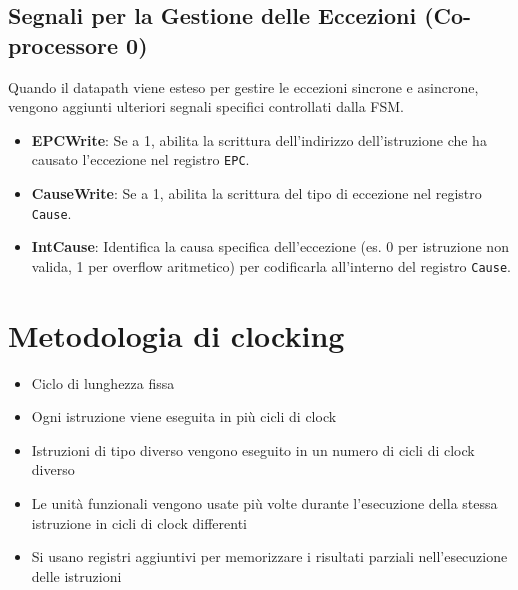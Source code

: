 \subsection{Segnali per la Gestione delle Eccezioni (Co-processore 0)}
Quando il datapath viene esteso per gestire le eccezioni sincrone e asincrone, vengono aggiunti ulteriori segnali specifici controllati dalla FSM.

\begin{itemize}
    \item \textbf{EPCWrite}: Se a 1, abilita la scrittura dell'indirizzo dell'istruzione che ha causato l'eccezione nel registro \texttt{EPC}.
    \item \textbf{CauseWrite}: Se a 1, abilita la scrittura del tipo di eccezione nel registro \texttt{Cause}.
    \item \textbf{IntCause}: Identifica la causa specifica dell'eccezione (es. 0 per istruzione non valida, 1 per overflow aritmetico) per codificarla all'interno del registro \texttt{Cause}.
\end{itemize}

\section{Metodologia di clocking}
\begin{itemize}
    \item Ciclo di lunghezza fissa
    \item Ogni istruzione viene eseguita in più cicli di clock
    \item Istruzioni di tipo diverso vengono eseguito in un numero di cicli di clock diverso
    \item Le unità funzionali vengono usate più volte durante l'esecuzione della stessa istruzione in cicli di clock differenti
    \item Si usano registri aggiuntivi per memorizzare i risultati parziali nell'esecuzione delle istruzioni
\end{itemize}

